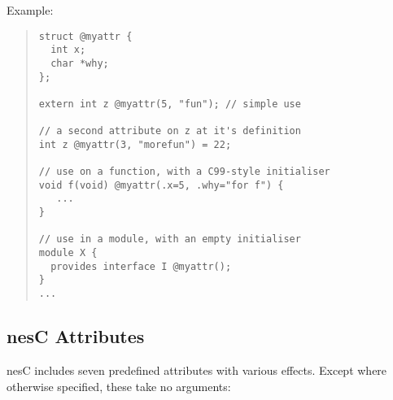 \documentclass[11pt,letterpaper]{article}
\newcommand{\nesc}{nesC\xspace}
\begin{document}
Example:
\begin{quote}
\begin{verbatim}
struct @myattr {
  int x;
  char *why;
};

extern int z @myattr(5, "fun"); // simple use

// a second attribute on z at it's definition
int z @myattr(3, "morefun") = 22;

// use on a function, with a C99-style initialiser
void f(void) @myattr(.x=5, .why="for f") {
   ...
}

// use in a module, with an empty initialiser
module X {
  provides interface I @myattr();
}
...
\end{verbatim}
\end{quote}

\subsection{\nesc Attributes}

\nesc includes seven predefined attributes with various effects. Except
where otherwise specified, these take no arguments:
\end{document}
